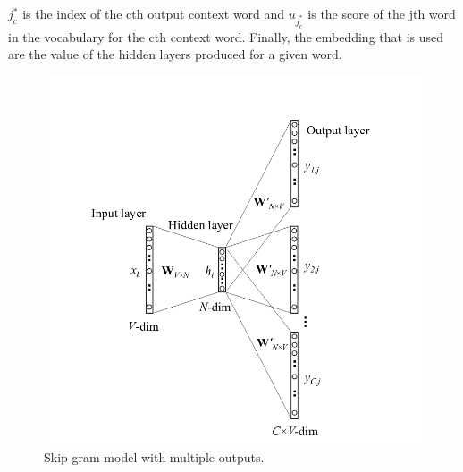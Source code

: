 $j_c^*$ is the index of the cth output context word and $u_{j^*_c}$ is the score of the jth word in the vocabulary for the cth context word. Finally, the embedding that is used are the value of the hidden layers produced for a given word. 
\begin{figure}
 \centering
 \includegraphics[width=\textwidth]{images/chapitre4/skip-gram}
 \caption{Skip-gram model with multiple outputs.}
 \label{fig:chap4:skip-gram}
\end{figure}
